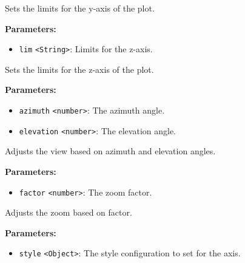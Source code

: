\documentclass[12pt,a4paper]{article}
\begin{document}
\noindent Sets the limits for the y-axis of the plot.

\vspace{5mm}
\noindent {}


\noindent \textbf{Parameters:}
\begin{itemize}
  \item \texttt{lim} \texttt{<String>}: Limits for the z-axis.
\end{itemize}

\noindent Sets the limits for the z-axis of the plot.

\vspace{5mm}
\noindent {}


\noindent \textbf{Parameters:}
\begin{itemize}
  \item \texttt{azimuth} \texttt{<number>}: The azimuth angle.
  \item \texttt{elevation} \texttt{<number>}: The elevation angle.
\end{itemize}

\noindent Adjusts the view based on azimuth and elevation angles.

\vspace{5mm}
\noindent {}


\noindent \textbf{Parameters:}
\begin{itemize}
  \item \texttt{factor} \texttt{<number>}: The zoom factor.
\end{itemize}

\noindent Adjusts the zoom based on factor.

\vspace{5mm}
\noindent {}


\noindent \textbf{Parameters:}
\begin{itemize}
  \item \texttt{style} \texttt{<Object>}: The style configuration to set for the axis.
\end{itemize}
\end{document}
